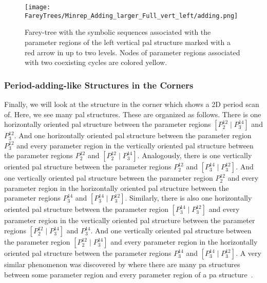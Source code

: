 \begin{figure}
	\centering
	\texttt{[image: FareyTrees/Minrep\_Adding\_larger\_Full\_vert\_left/adding.png]}
	\caption[Farey-tree with the symbolic sequences of a horizontal  structure]{
		Farey-tree with the symbolic sequences associated with the parameter regions of the left vertical \gls{pal} structure marked with a red arrow in  up to two levels.
		Nodes of parameter regions associated with two coexisting cycles are colored yellow.
	}
	\label{fig:add.add.like.vert.tree}
\end{figure}

\subsubsection{Period-adding-like Structures in the Corners}

Finally, we will look at the structure in the corner which  shows a 2D period scan of.
Here, we see many \gls{pal} structures.
These are organized as follows.
There is one horizontally oriented \gls{pal} structure between the parameter regions $\left[P^{12}_2 \mid P^{14}_3\right]$ and $P^{12}_3$.
And one horizontally oriented \gls{pal} structure between the parameter region $P^{12}_3$ and every parameter region in the vertically oriented \gls{pal} structure between the parameter regions $P^{12}_2$ and $\left[P^{12}_2 \mid P^{14}_3\right]$.
Analogously, there is one vertically oriented \gls{pal} structure between the parameter regions $P^{12}_2$ and $\left[P^{14}_3 \mid P^{12}_3\right]$.
And one vertically oriented \gls{pal} structure between the parameter region $P^{12}_2$ and every parameter region in the horizontally oriented \gls{pal} structure between the parameter regions $P^{14}_3$ and $\left[P^{14}_3 \mid P^{12}_3\right]$.
Similarly, there is also one horizontally oriented \gls{pal} structure between the parameter region $\left[P^{14}_3 \mid P^{12}_3\right]$ and every parameter region in the vertically oriented \gls{pal} structure between the parameter regions $\left[P^{12}_2 \mid P^{14}_3\right]$ and $P^{14}_3$.
And one vertically oriented \gls{pal} structure between the parameter region $\left[P^{12}_2 \mid P^{14}_3\right]$ and every parameter region in the horizontally oriented \gls{pal} structure between the parameter regions $P^{14}_3$ and $\left[P^{14}_3 \mid P^{12}_3\right]$.
A very similar phenomenon was discovered by  where there are many \gls{pa} structures between some parameter region and every parameter region of a \gls{pa} structure~\cite{tramontana2012period}.

